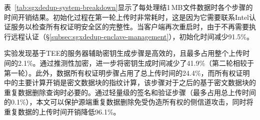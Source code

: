 表~\ref{tab:sgxdedup-system-breakdown}显示了每处理结1\,MB文件数据时各个步骤的时间开销结果。初始化过程在第一轮上传时非常耗时，这是因为它需要联系Intel认证服务以检查所有权证明安全区的完整性。当客户端再次重启时，由于不再需要执行远程认证（\S\ref{subsec:sgxdedup-enclave-management}），初始化时间减少91.5\%。

实验发现基于TEE的服务器辅助密钥生成步骤是高效的，且最多占用整个上传时间的2.1\%。通过推测性加密，\sysnameS 进一步将密钥生成时间减少了41.9\%（第二轮相较于第一轮）。此外，数据所有权证明步骤占用了总上传时间的24.4\%，而所有权证明中的主要计算开销是密文数据块的指纹计算，该步骤对于之后的基于密文数据块的重复数据删除查询时必要的。通过轻量级的签名和验证步骤（最多占用总上传时间的0.1\%），本文可以保护源端重复数据删除免受伪造所有权的侧信道攻击，同时将重复数据的上传时间开销降低96.1\%。

